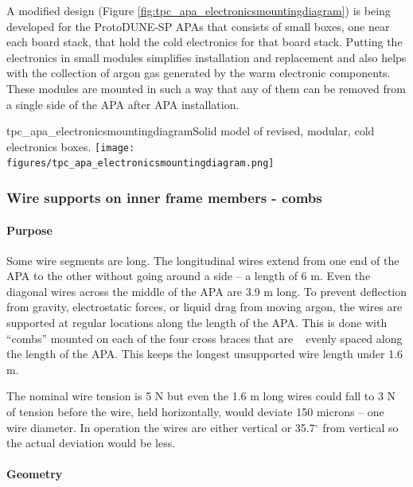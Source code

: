 A modified design (Figure \ref{fig:tpc_apa_electronicsmountingdiagram}) is being developed for the ProtoDUNE-SP APAs that consists of small boxes, one near each board stack, that hold the cold electronics for that board stack.  Putting the electronics in small modules simplifies installation and replacement and also helps with the collection of argon gas generated by the warm electronic components.  These modules are mounted in such a way that any of them can be removed from a single side of the APA after APA installation.

\begin{cdrfigure}{tpc_apa_electronicsmountingdiagram}{Solid model of revised, modular, cold electronics boxes.}
\texttt{[image: figures/tpc\_apa\_electronicsmountingdiagram.png]} 
\end{cdrfigure}

\subsubsection{Wire supports on inner frame members - combs}
\label{subsec:apa_combs}

\paragraph{Purpose}

Some wire segments are long.  The longitudinal wires extend from one end of the APA to the other without going around a side -- a length of 6 m.  Even the diagonal wires across the middle of the APA are 3.9 m long.  To prevent deflection from gravity, electrostatic forces, or liquid drag from moving argon, the wires are supported at regular locations along the length of the APA.  This is done with ``combs'' mounted on each of the four cross braces that are ~ evenly spaced along the length of the APA.  This keeps the longest unsupported wire length under 1.6 m.

The nominal wire tension is 5 N but even the 1.6 m long wires could fall to 3 N of tension before the wire, held horizontally, would deviate 150 microns -- one wire diameter.  In operation the wires are either vertical or 35.7$^{\circ}$ from vertical so the actual deviation would be less.

\paragraph{Geometry}

